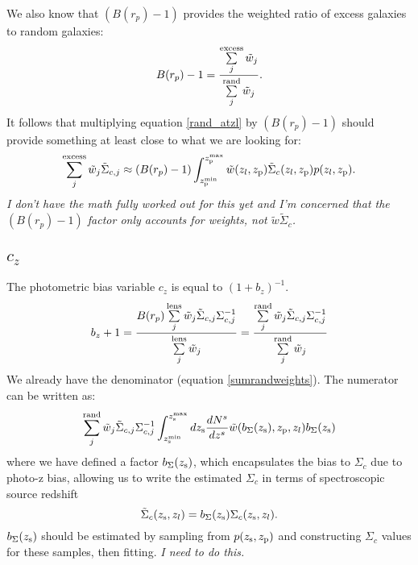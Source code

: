 \documentclass[onecolumn,amsmath,aps,fleqn, superscriptaddress]{revtex4}
\begin{document}
We also know that $(B(r_p) -1)$ provides the weighted ratio of excess galaxies to random galaxies:
\begin{equation}
B(r_p) - 1 = \frac{\sum\limits_{j}^{\rm excess} \tilde{w}_j}{\sum\limits_{j}^{\rm rand} \tilde{w}_j}.
\label{boostminus1}
\end{equation}
It follows that multiplying equation \ref{rand_atzl} by $(B(r_p) - 1)$ should provide something at least close to what we are looking for:
\begin{equation}
\sum\limits_{j}^{\rm excess} \tilde{w}_j \tilde{\Sigma}_{c,j} \approx (B(r_p) - 1) \int_{z_{\rm p}^{\rm min}}^{z_{\rm p}^{\rm max}} \tilde{w}(z_l, z_{\rm p}) \tilde{\Sigma}_c(z_l, z_{\rm p}) p(z_l, z_{\rm p}).
\label{sumexcesswSigC}
\end{equation}
{\it I don't have the math fully worked out for this yet and I'm concerned that the $(B(r_p)-1)$ factor only accounts for weights, not $\tilde{w} \tilde{\Sigma}_c$.}


\subsection*{$c_z$}

The photometric bias variable $c_z$ is equal to $(1+b_z)^{-1}$.
\begin{equation}
b_z+1 = \frac{B(r_p) \sum\limits^{\rm lens}_{j} \tilde{w}_j \tilde{\Sigma}_{c,j} \Sigma_{c,j}^{-1}}{\sum\limits^{\rm lens}_{j} \tilde{w}_j} = \frac{\sum\limits^{\rm rand}_{j} \tilde{w}_j \tilde{\Sigma}_{c,j} \Sigma_{c,j}^{-1}}{\sum\limits^{\rm rand}_{j} \tilde{w}_j}
\label{photozbias}
\end{equation}
We already have the denominator (equation \ref{sumrandweights}). The numerator can be written as:
\begin{equation}
\sum\limits^{\rm rand}_{j} \tilde{w}_j \tilde{\Sigma}_{c,j} \Sigma_{c,j}^{-1} \int_{z_{\rm s}^{\rm min}}^{z_{\rm s}^{\rm max}}dz_{\rm s} \frac{dN^s}{dz^s} \tilde{w}(b_{\Sigma}(z_{\rm s}), z_{\rm p}, z_l) b_\Sigma(z_{\rm s}) 
\label{photoz}
\end{equation}
where we have defined a factor $b_{\Sigma}(z_{\rm s})$, which encapsulates the bias to $\Sigma_c$ due to photo-z bias, allowing us to write the estimated $\Sigma_c$ in terms of spectroscopic source redshift 
\begin{equation}
\tilde{\Sigma}_c(z_{\rm s}, z_l) = b_\Sigma(z_{\rm s}) \Sigma_c(z_{\rm s}, z_l).
\label{bsig}
\end{equation}
$b_\Sigma(z_{\rm s})$ should be estimated by sampling from $p(z_{\rm s}, z_{\rm p})$ and constructing $\Sigma_c$ values for these samples, then fitting. {\it I need to do this.}
\end{document}
